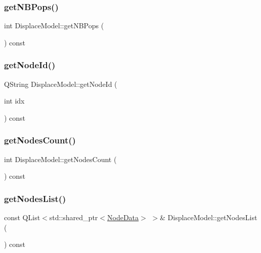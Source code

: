 \mbox{\label{class_displace_model_a2ccd48a91532db0c5f5f105249aab605}} 
\subsubsection{\texorpdfstring{getNBPops()}{getNBPops()}}
{\footnotesize\ttfamily int Displace\+Model\+::get\+N\+B\+Pops (\begin{DoxyParamCaption}{ }\end{DoxyParamCaption}) const\hspace{0.3cm}{\ttfamily [inline]}}

\mbox{\label{class_displace_model_ab62e17f9f7a6d9f39bf08f90fe46b8ef}} 
\subsubsection{\texorpdfstring{getNodeId()}{getNodeId()}}
{\footnotesize\ttfamily Q\+String Displace\+Model\+::get\+Node\+Id (\begin{DoxyParamCaption}\item[{int}]{idx }\end{DoxyParamCaption}) const}

\mbox{\label{class_displace_model_a45b44fe5ab1354ad05ec3909130c570b}} 
\subsubsection{\texorpdfstring{getNodesCount()}{getNodesCount()}}
{\footnotesize\ttfamily int Displace\+Model\+::get\+Nodes\+Count (\begin{DoxyParamCaption}{ }\end{DoxyParamCaption}) const}

\mbox{\label{class_displace_model_a76d0c1079e730ea8d5284ee58f3eb867}} 
\subsubsection{\texorpdfstring{getNodesList()}{getNodesList()}}
{\footnotesize\ttfamily const Q\+List$<$std\+::shared\+\_\+ptr$<$\mbox{\hyperlink{class_node_data}{Node\+Data}}$>$ $>$\& Displace\+Model\+::get\+Nodes\+List (\begin{DoxyParamCaption}{ }\end{DoxyParamCaption}) const\hspace{0.3cm}{\ttfamily [inline]}}

